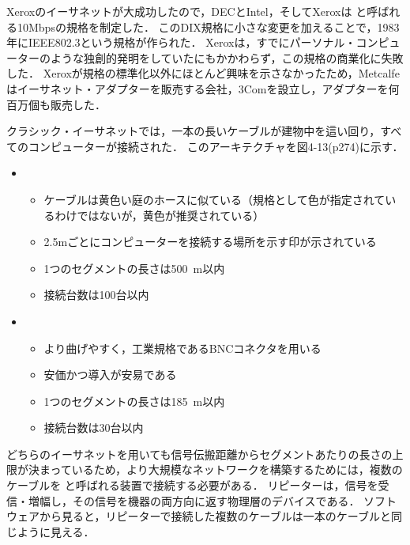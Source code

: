 \documentclass[a4paper]{ltjsarticle}
\begin{document}
Xeroxのイーサネットが大成功したので，DECとIntel，そしてXeroxは
 と呼ばれる10Mbpsの規格を制定した．
このDIX規格に小さな変更を加えることで，1983年にIEEE802.3という規格が作られた．
Xeroxは，すでにパーソナル・コンピューターのような独創的発明をしていたにもかかわらず，この規格の商業化に失敗した．
Xeroxが規格の標準化以外にほとんど興味を示さなかったため，Metcalfeはイーサネット・アダプターを販売する会社，3Comを設立し，アダプターを何百万個も販売した．

クラシック・イーサネットでは，一本の長いケーブルが建物中を這い回り，すべてのコンピューターが接続された．
このアーキテクチャを図4-13(p274)に示す．

\begin{itemize}
\item

  \begin{itemize}
  \item
    ケーブルは黄色い庭のホースに似ている（規格として色が指定されているわけではないが，黄色が推奨されている）
  \item
    2.5mごとにコンピューターを接続する場所を示す印が示されている
  \item
    1つのセグメントの長さは\SI{500}{m}以内
  \item
    接続台数は100台以内
  \end{itemize}
\item

  \begin{itemize}
  \item
    より曲げやすく，工業規格であるBNCコネクタを用いる
  \item
    安価かつ導入が安易である
  \item
    1つのセグメントの長さは\SI{185}{m}以内
  \item
    接続台数は30台以内
  \end{itemize}
\end{itemize}

どちらのイーサネットを用いても信号伝搬距離からセグメントあたりの長さの上限が決まっているため，より大規模なネットワークを構築するためには，複数のケーブルを
 と呼ばれる装置で接続する必要がある．
リピーターは，信号を受信・増幅し，その信号を機器の両方向に返す物理層のデバイスである．
ソフトウェアから見ると，リピーターで接続した複数のケーブルは一本のケーブルと同じように見える．
\end{document}

